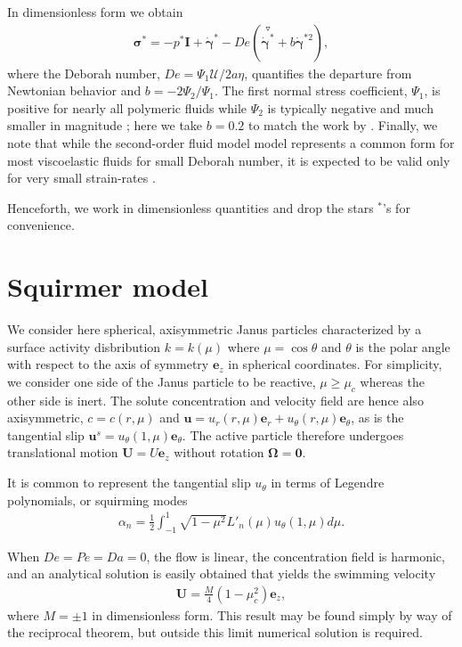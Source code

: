 \documentclass[aps,pre,reprint,twocolumn,notitlepage,superscriptaddress]{revtex4-1}
\begin{document}
In dimensionless form we obtain
\begin{align}\label{SOdim}
\boldsymbol{\sigma}^{*}=-p^*\boldsymbol{I}+\dot{\boldsymbol{\gamma}}^{*}-De\left(\overset{\triangledown}{\dot{\boldsymbol{\gamma}}^{*}}+b\dot{\boldsymbol{\gamma}}^{*2}\right),
\end{align}
where the Deborah number, $De=\Psi_{1}\mathcal{U} /2a\eta$, quantifies the departure from Newtonian behavior  \citep{decorato15, decorato16b} and $b=-2\Psi_{2}/\Psi_{1}$. The first normal stress coefficient, $\Psi_1$, is positive for nearly all polymeric fluids while $\Psi_2$ is typically negative and much smaller in magnitude \cite{bird95}; here we take $b=0.2$ to match the work by \citet{decorato15}. Finally, we note that while the second-order fluid model model represents a common form for most viscoelastic fluids for small Deborah number, it is expected to be valid only for very small strain-rates \citep{bird1977dynamics,leal80}.

Henceforth, we work in dimensionless quantities and drop the stars $^*$'s for convenience.

\section{Squirmer model}
We consider here spherical, axisymmetric Janus particles characterized by a surface activity disbribution $k=k(\mu)$  where $\mu=\cos \theta$ and $\theta$ is the polar angle with respect to the axis of symmetry $\boldsymbol{e}_{z}$ in spherical coordinates. For simplicity, we consider one side of the Janus particle to be reactive, $\mu \ge \mu_c$ whereas the other side is inert. The solute concentration and velocity field are hence also axisymmetric, $c=c(r,\mu)$ and $\boldsymbol{u} = u_r(r,\mu)\boldsymbol{e}_r+u_\theta(r,\mu)\boldsymbol{e}_\theta$, as is the tangential slip $\boldsymbol{u}^s = u_\theta(1,\mu)\boldsymbol{e}_\theta$. The active particle therefore undergoes translational motion $\boldsymbol{U} = U\boldsymbol{e}_z$ without rotation $\boldsymbol{\Omega}=\boldsymbol{0}$.

It is common to represent the tangential slip $u_{\theta}$ in terms of Legendre polynomials, or squirming modes
\begin{align}\label{alpha}
\alpha_{n}=\frac{1}{2}\int^{1}_{-1}\sqrt{1-\mu^{2}}L'_{n}(\mu)u_{\theta}(1,\mu)d\mu.
\end{align}

When $De=Pe=Da=0$, the flow is linear, the concentration field is harmonic, and an analytical solution is easily obtained that yields the swimming velocity
\begin{align}\label{cPe0}
			\boldsymbol{U}=\frac{M}{4}\left(1-\mu_{c}^{2}\right)\boldsymbol{e}_{z}, 
\end{align} 
where $M=\pm1$ in dimensionless form. This result may be found simply by way of the reciprocal theorem\citep{michelin14}, but outside this limit numerical solution is required.
\end{document}
